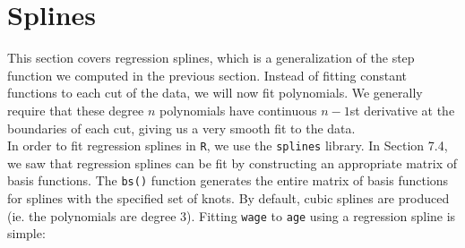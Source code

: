 \documentclass[12pt]{article}\usepackage[]{graphicx}\usepackage[]{color}
\begin{document}
\newpage
\section{Splines}

This section covers regression splines, which is a generalization of the step function we computed in the previous section. Instead of fitting constant functions to each cut of the data, we will now fit polynomials. We generally require that these degree $n$ polynomials have continuous $n-1$st derivative at the boundaries of each cut, giving us a very smooth fit to the data.\\

In order to fit regression splines in \texttt{R}, we use the \texttt{splines} library. In Section 7.4, we saw that regression splines can be fit by constructing an appropriate matrix of basis functions. The \texttt{bs()} function generates the entire matrix of basis functions for splines with the specified set of knots. By default, cubic splines are produced (ie. the polynomials are degree $3$). Fitting \texttt{wage} to \texttt{age} using a regression spline is simple:
\end{document}
